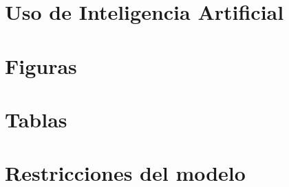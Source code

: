 \documentclass[spanish]{pucthesis}
\begin{document}
\newpage


\appendix

\chapter{Uso de Inteligencia Artificial}


\newpage

\chapter{Figuras}
\label{anexo:graficos}


\newpage

\chapter{Tablas}
\label{anexo:tabla_comparativa}


\newpage

\chapter{Restricciones del modelo}
\label{anexo:restricciones}


%
\end{document}
